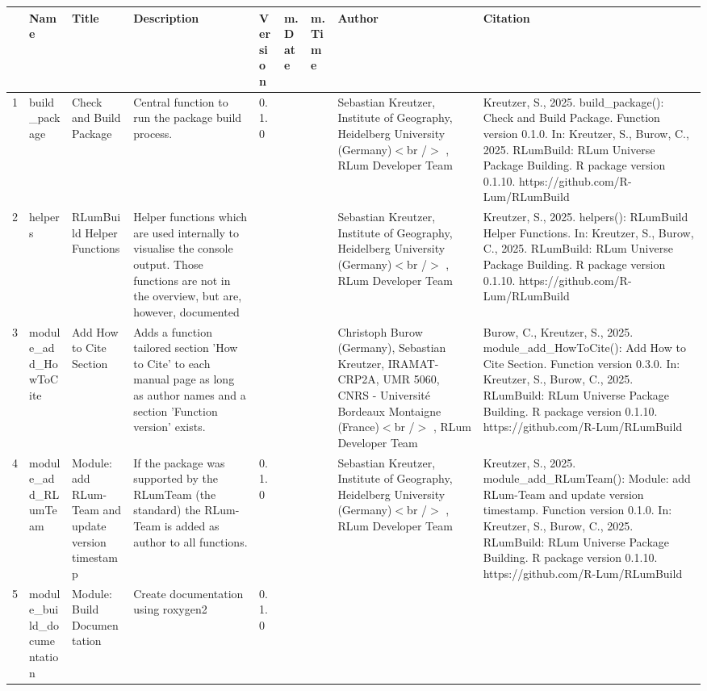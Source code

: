\begin{table}[ht]
\centering
\begin{tabular}{rllllllll}
  \hline
 & Name & Title & Description & Version & m.Date & m.Time & Author & Citation \\ 
  \hline
1 & build\_package & Check and Build Package & Central function to run the package build process. & 0.1.0
 &  &  & Sebastian Kreutzer, Institute of Geography, Heidelberg University (Germany)$<$br /$>$ , RLum Developer Team & Kreutzer, S., 2025. build\_package(): Check and Build Package. Function version 0.1.0. In: Kreutzer, S., Burow, C., 2025. RLumBuild: RLum Universe Package Building. R package version 0.1.10. https://github.com/R-Lum/RLumBuild
 \\ 
  2 & helpers & RLumBuild Helper Functions & Helper functions which are used internally to visualise the console output. Those functions are not in the overview, but are, however, documented &  &  &  & Sebastian Kreutzer, Institute of Geography, Heidelberg University (Germany)$<$br /$>$ , RLum Developer Team & Kreutzer, S., 2025. helpers(): RLumBuild Helper Functions. In: Kreutzer, S., Burow, C., 2025. RLumBuild: RLum Universe Package Building. R package version 0.1.10. https://github.com/R-Lum/RLumBuild
 \\ 
  3 & module\_add\_HowToCite & Add How to Cite Section & Adds a function tailored section 'How to Cite' to each manual page as long as author names and a section 'Function version' exists. &  &  &  & Christoph Burow (Germany), Sebastian Kreutzer, IRAMAT-CRP2A, UMR 5060, CNRS - Université Bordeaux Montaigne (France)$<$br /$>$ , RLum Developer Team & Burow, C., Kreutzer, S., 2025. module\_add\_HowToCite(): Add How to Cite Section. Function version 0.3.0. In: Kreutzer, S., Burow, C., 2025. RLumBuild: RLum Universe Package Building. R package version 0.1.10. https://github.com/R-Lum/RLumBuild
 \\ 
  4 & module\_add\_RLumTeam & Module: add RLum-Team and update version timestamp & If the package was supported by the RLumTeam (the standard) the RLum-Team is added as author to all functions. & 0.1.0
 &  &  & Sebastian Kreutzer, Institute of Geography, Heidelberg University (Germany)$<$br /$>$ , RLum Developer Team & Kreutzer, S., 2025. module\_add\_RLumTeam(): Module: add RLum-Team and update version timestamp. Function version 0.1.0. In: Kreutzer, S., Burow, C., 2025. RLumBuild: RLum Universe Package Building. R package version 0.1.10. https://github.com/R-Lum/RLumBuild
 \\ 
  5 & module\_build\_documentation & Module: Build Documentation & Create documentation using roxygen2 & 0.1.0

\end{tabular}
\end{table}
